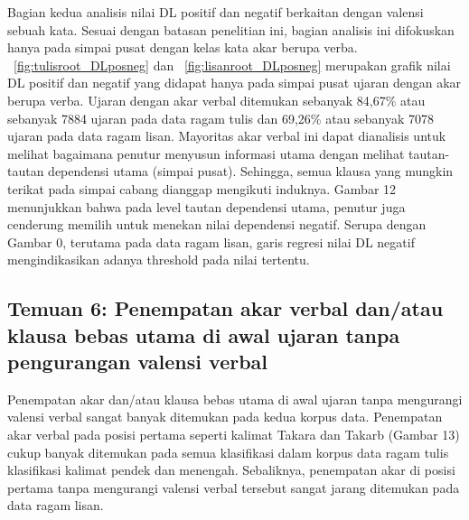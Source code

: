 Bagian kedua analisis nilai DL positif dan negatif berkaitan dengan valensi sebuah kata. Sesuai dengan batasan penelitian ini, bagian analisis ini difokuskan hanya pada simpai pusat dengan kelas kata akar berupa verba. \pic~\ref{fig:tulisroot_DLposneg} dan \pic~\ref{fig:lisanroot_DLposneg} merupakan grafik nilai DL positif dan negatif  yang didapat hanya pada simpai pusat ujaran dengan akar berupa verba. Ujaran dengan akar verbal ditemukan sebanyak 84,67\% atau sebanyak 7884 ujaran pada data ragam tulis dan 69,26\% atau sebanyak 7078 ujaran pada data ragam lisan. Mayoritas akar verbal ini dapat dianalisis untuk melihat bagaimana penutur menyusun informasi utama dengan melihat tautan-tautan dependensi utama (simpai pusat). Sehingga, semua klausa yang mungkin terikat pada simpai cabang dianggap mengikuti induknya. Gambar 12 menunjukkan bahwa pada level tautan dependensi utama, penutur juga cenderung memilih untuk menekan nilai dependensi negatif. Serupa dengan Gambar 0, terutama pada data ragam lisan, garis regresi nilai DL negatif mengindikasikan adanya threshold pada nilai tertentu. 	

\subsection{Temuan 6: Penempatan akar verbal dan/atau klausa bebas utama di awal ujaran tanpa pengurangan valensi verbal}
Penempatan akar dan/atau klausa bebas utama di awal ujaran tanpa mengurangi valensi verbal sangat banyak ditemukan pada kedua korpus data. Penempatan akar verbal pada posisi pertama seperti kalimat Takara dan Takarb (Gambar 13) cukup banyak ditemukan pada semua klasifikasi dalam korpus data ragam tulis klasifikasi kalimat pendek dan menengah. Sebaliknya, penempatan akar di posisi pertama tanpa mengurangi valensi verbal tersebut sangat jarang ditemukan pada data ragam lisan.

